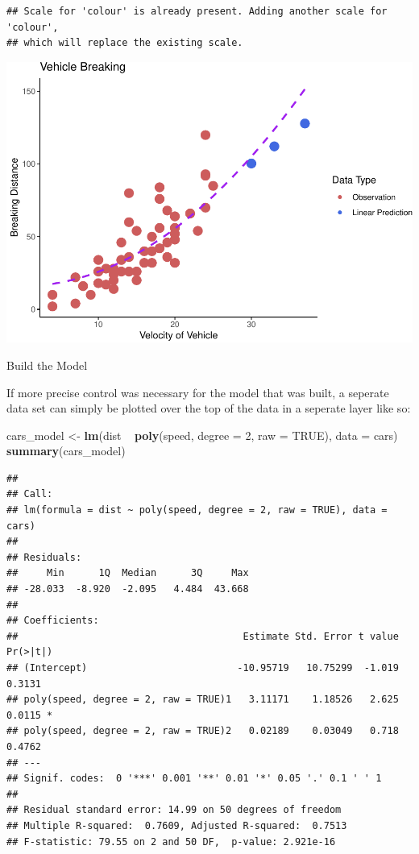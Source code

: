\documentclass[]{article}
\newenvironment{Shaded}{}{}
\newcommand{\DataTypeTok}[1]{\textcolor[rgb]{0.56,0.13,0.00}{#1}}
\newcommand{\DecValTok}[1]{\textcolor[rgb]{0.25,0.63,0.44}{#1}}
\newcommand{\KeywordTok}[1]{\textcolor[rgb]{0.00,0.44,0.13}{\textbf{#1}}}
\newcommand{\NormalTok}[1]{#1}
\newcommand{\OperatorTok}[1]{\textcolor[rgb]{0.40,0.40,0.40}{#1}}
\newcommand{\OtherTok}[1]{\textcolor[rgb]{0.00,0.44,0.13}{#1}}
\newcommand{\StringTok}[1]{\textcolor[rgb]{0.25,0.44,0.63}{#1}}
\begin{document}
\begin{verbatim}
## Scale for 'colour' is already present. Adding another scale for 'colour',
## which will replace the existing scale.
\end{verbatim}

\includegraphics{./figure/unnamed-chunk-18-1.pdf}

Build the Model

If more precise control was necessary for the model that was built, a
seperate data set can simply be plotted over the top of the data in a
seperate layer like so:

\begin{Shaded}
\begin{Highlighting}[]
\NormalTok{cars_model <-}\StringTok{ }\KeywordTok{lm}\NormalTok{(dist }\OperatorTok{~}\StringTok{ }\KeywordTok{poly}\NormalTok{(speed, }\DataTypeTok{degree =} \DecValTok{2}\NormalTok{, }\DataTypeTok{raw =} \OtherTok{TRUE}\NormalTok{), }\DataTypeTok{data =}\NormalTok{ cars)}
\KeywordTok{summary}\NormalTok{(cars_model)}
\end{Highlighting}
\end{Shaded}

\begin{verbatim}
## 
## Call:
## lm(formula = dist ~ poly(speed, degree = 2, raw = TRUE), data = cars)
## 
## Residuals:
##     Min      1Q  Median      3Q     Max 
## -28.033  -8.920  -2.095   4.484  43.668 
## 
## Coefficients:
##                                       Estimate Std. Error t value Pr(>|t|)  
## (Intercept)                          -10.95719   10.75299  -1.019   0.3131  
## poly(speed, degree = 2, raw = TRUE)1   3.11171    1.18526   2.625   0.0115 *
## poly(speed, degree = 2, raw = TRUE)2   0.02189    0.03049   0.718   0.4762  
## ---
## Signif. codes:  0 '***' 0.001 '**' 0.01 '*' 0.05 '.' 0.1 ' ' 1
## 
## Residual standard error: 14.99 on 50 degrees of freedom
## Multiple R-squared:  0.7609, Adjusted R-squared:  0.7513 
## F-statistic: 79.55 on 2 and 50 DF,  p-value: 2.921e-16
\end{verbatim}
\end{document}
